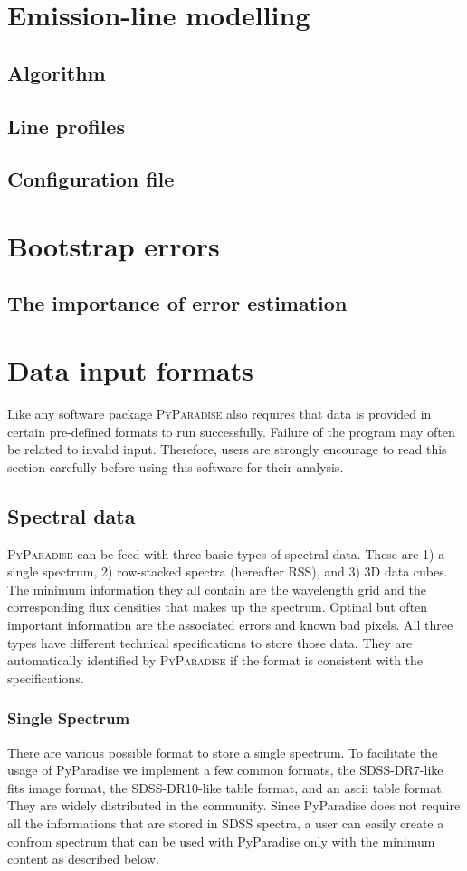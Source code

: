 \documentclass[usenatbib,usegraphicx,useAMS]{mn2e}
\begin{document}
\section{Emission-line modelling}
\subsection{Algorithm}
\subsection{Line profiles}
\subsection{Configuration file}

\section{Bootstrap errors}
\subsection{The importance of error estimation}

\section{Data input formats}
Like any software package \textsc{PyParadise} also requires that data is provided in certain pre-defined formats to run successfully. Failure of the program may often be related to invalid input. 
Therefore, users are strongly encourage to read this section carefully before using this software for their analysis. 
\subsection{Spectral data}
\textsc{PyParadise} can be feed with three basic types of spectral data. These are 1) a single spectrum, 2) row-stacked spectra (hereafter RSS), and 3) 3D data cubes. The minimum information they all 
contain are the wavelength grid and the corresponding flux densities that makes up the spectrum. Optinal but often important information are the associated errors and known bad pixels. All three 
types have different technical specifications to store those data.   They are automatically identified by \textsc{PyParadise} if the format is consistent with the specifications. 
\subsubsection{Single Spectrum}
There are various possible format to store a single spectrum. To facilitate the usage of PyParadise we implement a few common formats, the SDSS-DR7-like fits image format, the SDSS-DR10-like table 
format, and an ascii table format. They are widely distributed in the community. Since PyParadise does not require all the informations that are stored in SDSS spectra, a user can easily create a 
confrom spectrum that can be used with PyParadise only with the minimum content as described below.
\end{document}
